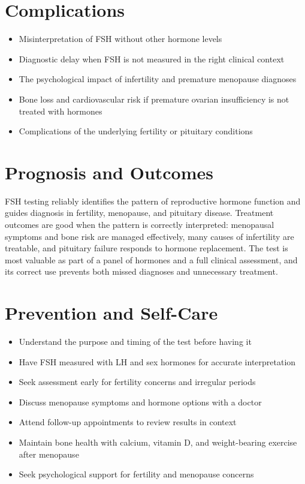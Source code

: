 \section*{Complications}
\begin{itemize}
    \item Misinterpretation of FSH without other hormone levels
    \item Diagnostic delay when FSH is not measured in the right clinical context
    \item The psychological impact of infertility and premature menopause diagnoses
    \item Bone loss and cardiovascular risk if premature ovarian insufficiency is not treated with hormones
    \item Complications of the underlying fertility or pituitary conditions
\end{itemize}

\section*{Prognosis and Outcomes}
FSH testing reliably identifies the pattern of reproductive hormone function and guides diagnosis in fertility, menopause, and pituitary disease. Treatment outcomes are good when the pattern is correctly interpreted: menopausal symptoms and bone risk are managed effectively, many causes of infertility are treatable, and pituitary failure responds to hormone replacement. The test is most valuable as part of a panel of hormones and a full clinical assessment, and its correct use prevents both missed diagnoses and unnecessary treatment.

\section*{Prevention and Self-Care}
\begin{itemize}
    \item Understand the purpose and timing of the test before having it
    \item Have FSH measured with LH and sex hormones for accurate interpretation
    \item Seek assessment early for fertility concerns and irregular periods
    \item Discuss menopause symptoms and hormone options with a doctor
    \item Attend follow-up appointments to review results in context
    \item Maintain bone health with calcium, vitamin D, and weight-bearing exercise after menopause
    \item Seek psychological support for fertility and menopause concerns
\end{itemize}

